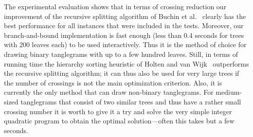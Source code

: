 \documentclass[runningheads,a4paper]{llncs}
\begin{document}
The experimental evaluation shows that in terms of crossing
reduction our improvement of the recursive splitting algorithm of Buchin et
al.~\cite{bbbnow-dbtha-08} clearly has the best performance for all
instances that were included in the tests.  Moreover, our
branch-and-bound implementation is fast enough (less than 0.4
seconds for trees with 200 leaves each) to be used interactively.
Thus it is the method of choice for drawing binary tanglegrams with
up to a few hundred leaves. Still, in terms of running time the
hierarchy sorting heuristic of Holten and van
Wijk~\cite{hw-vchod-08} outperforms the recursive splitting
algorithm; it can thus also be used for very large trees if the number
of crossings is not the main optimization criterion.  Also, it is
currently the only method that can draw non-binary tanglegrams.  For 
medium-sized tanglegrams that consist of two similar trees and thus
have a rather small crossing number it is worth to give it a try and
solve the very simple integer quadratic program
to obtain the optimal solution---often this takes but a few seconds.
\end{document}
